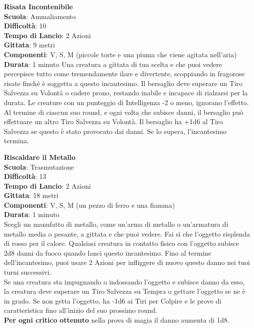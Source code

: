 \begin{multicols}{2}
\medskip\textbf{Risata Incontenibile}\\
\textbf{Scuola}: Ammaliamento\\
\textbf{Difficoltà}: 10\\
\textbf{Tempo di Lancio}: 2 Azioni\\
\textbf{Gittata}: 9 metri\\
\textbf{Componenti}: V, S, M (piccole torte e una piuma che viene agitata nell'aria)\\
\textbf{Durata}: 1 minuto 
Una creatura a gittata di tua scelta e che puoi vedere percepisce tutto come tremendamente ilare e divertente, scoppiando in fragorose risate finché è soggetta a questo incantesimo. Il bersaglio deve superare un Tiro Salvezza su Volontà o cadere prono, restando inabile e incapace di rialzarsi per la durata. Le creature con un punteggio di Intelligenza -2 o meno, ignorano l'effetto.\\
Al termine di ciascun suo round, e ogni volta che subisce danni, il bersaglio può effettuare un altro Tiro Salvezza su Volontà. Il bersaglio ha +1d6 al Tiro Salvezza se questo è stato provocato dai danni. Se lo supera, l'incantesimo termina.

\medskip\textbf{Riscaldare il Metallo}\\
\textbf{Scuola}: Trasmutazione\\
\textbf{Difficoltà}: 13\\
\textbf{Tempo di Lancio}: 2 Azioni\\
\textbf{Gittata}: 18 metri\\
\textbf{Componenti}: V, S, M (un pezzo di ferro e una fiamma)\\
\textbf{Durata}: 1 minuto\\
Scegli un manufatto di metallo, come un'arma di metallo o un'armatura di metallo media o pesante, a gittata e che puoi vedere. Fai sì che l'oggetto risplenda di rosso per il calore. Qualsiasi creatura in contatto fisico con l'oggetto subisce 2d8 danni da fuoco quando lanci questo incantesimo. Fino al termine dell'incantesimo, puoi usare 2 Azioni per infliggere di nuovo questo danno nei tuoi turni successivi.\\
Se una creatura sta impugnando o indossando l'oggetto e subisce danno da esso, la creatura deve superare un Tiro Salvezza su Tempra o gettare l'oggetto se ne è in grado. Se non getta l'oggetto, ha -1d6 ai Tiri per Colpire e le prove di caratteristica fino all'inizio del suo prossimo round.\\
\textbf{Per ogni critico ottenuto} nella prova di magia il danno aumenta di 1d8.


\end{multicols}
